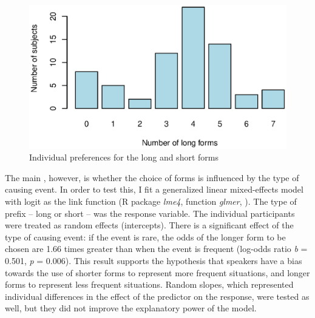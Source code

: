 \documentclass[output=paper]{langsci/langscibook}
\begin{document}
  

\begin{figure}

\includegraphics[width=\textwidth]{figures/Figure4.eps}
\caption{Individual preferences for the long and short forms}
\label{fig:levshina:4}
\end{figure}



The main , however, is whether the choice of forms is influenced by the type of causing event. In order to test this, I fit a generalized linear mixed-effects model with logit as the link function (R package \textit{lme4}, function \textit{glmer}, \citealt{BatesEtAl2015}). The type of prefix – long or short – was the response variable. The individual participants were treated as random effects (intercepts). There is a significant effect of the type of causing event: if the event is rare, the odds of the longer form to be chosen are 1.66 times greater than when the event is frequent (log-odds ratio \textit{b} = 0.501, \textit{p} = 0.006). This result supports the hypothesis that speakers have a bias towards the use of shorter forms to represent more frequent situations, and longer forms to represent less frequent situations. Random slopes, which represented individual differences in the effect of the predictor on the response, were tested as well, but they did not improve the explanatory power of the model. 
\end{document}
